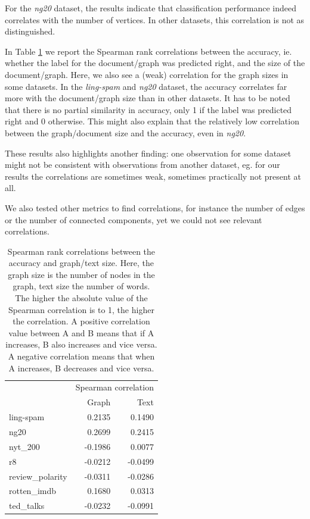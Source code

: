 For the \textit{ng20} dataset, the results indicate that classification performance indeed correlates with the number of vertices.
In other datasets, this correlation is not as distinguished.
\fi

In Table \ref{table:correlations_size} we report the Spearman rank correlations \cite{Hauke2011} between the accuracy, ie. whether the label for the document/graph was predicted right, and the size of the document/graph.
Here, we also see a (weak) correlation for the graph sizes in some datasets.
In the \textit{ling-spam} and \textit{ng20} dataset, the accuracy correlates far more with the document/graph size than in other datasets.
It has to be noted that there is no partial similarity in accuracy, only 1 if the label was predicted right and 0 otherwise.
This might also explain that the relatively low correlation between the graph/document size and the accuracy, even in \textit{ng20}.

These results also highlights another finding: one observation for some dataset might not be consistent with observations from another dataset, eg. for our results the correlations are sometimes weak, sometimes practically not present at all.

We also tested other metrics to find correlations, for instance the number of edges or the number of connected components, yet we could not see relevant correlations.

\begin{table}[htb!]
	\centering
	\begin{tabular}{lrr}
\toprule
		&  \multicolumn{2}{c}{Spearman correlation} \\
		&  Graph &  Text \\
		\midrule
		ling-spam       &  0.2135 &  0.1490 \\
		ng20            &  0.2699 &  0.2415 \\
		nyt\_200         & -0.1986 &  0.0077 \\
		r8              & -0.0212 & -0.0499 \\
		review\_polarity & -0.0311 & -0.0286 \\
		rotten\_imdb     &  0.1680 &  0.0313 \\
		ted\_talks       & -0.0232 & -0.0991 \\
		\bottomrule
	\end{tabular}
	\caption[Table: Graph/text size correlations]{Spearman rank correlations between the accuracy and graph/text size. Here, the graph size is the number of nodes in the graph, text size the number of words. The higher the absolute value of the Spearman correlation is to 1, the higher the correlation.
	A positive correlation value between A and B means that if A increases, B also increases and vice versa.
	A negative correlation means that when A increases, B decreases and vice versa.}%
	\label{table:correlations_size}
\end{table}

